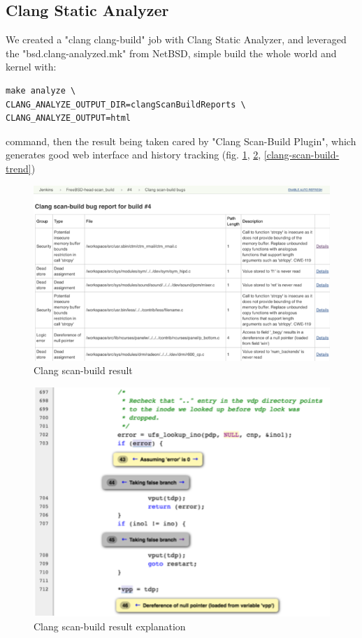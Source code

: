 \documentclass[a4paper,twocolumn,10pt]{article}
\begin{document}
\subsection{Clang Static Analyzer}

We created a "clang clang-build" job with Clang Static Analyzer, and leveraged
the "bsd.clang-analyzed.mk" from NetBSD, simple build the whole world and
kernel with:

\begin{lstlisting}
make analyze \
CLANG_ANALYZE_OUTPUT_DIR=clangScanBuildReports \
CLANG_ANALYZE_OUTPUT=html
\end{lstlisting}

command, then the result being taken cared by "Clang Scan-Build Plugin", which
generates good web interface and history tracking (fig.
\ref{scan-build-result}, \ref{scan-build-path}, \ref{clang-scan-build-trend})

\begin{figure}
\includegraphics[width=\textwidth]{scan-build-result.png}
\caption{Clang scan-build result}
\label{scan-build-result}
\end{figure}

\begin{figure}
\includegraphics[width=\textwidth]{scan-build-path.png}
\caption{Clang scan-build result explanation}
\label{scan-build-path}
\end{figure}
\end{document}
